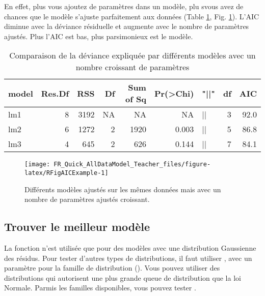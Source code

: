 \documentclass[french,a4paper]{article}
\begin{document}
En effet, plus vous ajoutez de paramètres dans un modèle, plu svous avez
de chances que le modèle s'ajuste parfaitement aux données (Table
\ref{tab:RTableAnovaEx}, Fig. \ref{fig:RFigAICExample}). L'AIC diminue
avec la déviance résiduelle et augmente avec le nombre de paramètres
ajustés. Plus l'AIC est bas, plus parsimonieux est le modèle.




\begin{table}

\caption{\label{tab:RTableAnovaEx}Comparaison de la déviance expliquée par différents modèles avec un nombre croissant de paramètres}
\centering
\begin{tabular}[t]{l|r|r|r|r|r|l|r|r}
\hline
model & Res.Df & RSS & Df & Sum of Sq & Pr(>Chi) & "||" & df & AIC\\
\hline
lm1 & 8 & 3192 & NA & NA & NA & || & 3 & 92.0\\
\hline
lm2 & 6 & 1272 & 2 & 1920 & 0.003 & || & 5 & 86.8\\
\hline
lm3 & 4 & 645 & 2 & 626 & 0.144 & || & 7 & 84.1\\
\hline
\end{tabular}
\end{table}

\begin{figure}[!h]

{\centering \texttt{[image: FR\_Quick\_AllDataModel\_Teacher\_files/figure-latex/RFigAICExample-1]} 

}

\caption{Différents modèles ajustés sur les mêmes données
mais avec un nombre de paramètres ajustés croissant.}\label{fig:RFigAICExample}
\end{figure}

\subsection{Trouver le meilleur
modèle}\label{trouver-le-meilleur-modele}

La fonction  n'est utilisée que pour des modèles avec
une distribution Gaussienne des résidus. Pour tester d'autres types de
distributions, il faut utiliser , avec un paramètre
pour la famille de distribution (). Vous pouvez
utiliser des distributions qui autorisent une plus grande queue de
distribution que la loi Normale. Parmis les familles disponibles, vous
pouvez tester .
\end{document}
